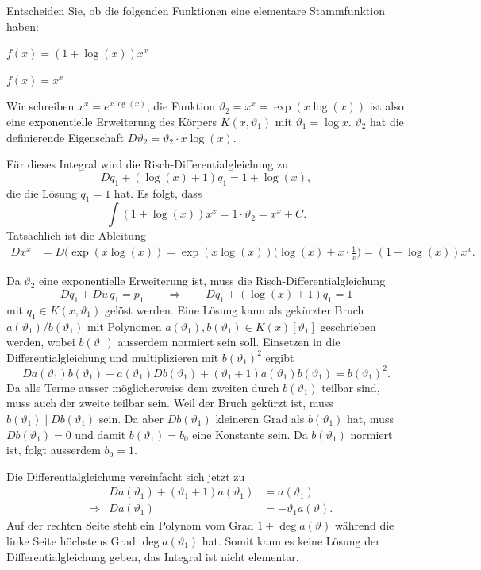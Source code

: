 Entscheiden Sie, ob die folgenden Funktionen eine elementare Stammfunktion
haben:
\begin{teilaufgaben}
\item $f(x)= (1+\log(x))x^x$
\item $f(x)=x^x$
\end{teilaufgaben}

\begin{loesung}
Wir schreiben $x^x = e^{x \log(x)}$, die Funktion
$\vartheta_2 = x^x = \exp(x\log(x))$ ist also eine exponentielle Erweiterung
des Körpers $K(x,\vartheta_1)$ mit $\vartheta_1=\log x$.
$\vartheta_2$ hat die definierende Eigenschaft
$D\vartheta_2 = \vartheta_2 \cdot x\log(x)$.
\begin{teilaufgaben}
\item 
Für dieses Integral wird die Risch-Differentialgleichung zu
\[
Dq_1 + (\log(x)+1)q_1 = 1 + \log(x),
\]
die die Lösung $q_1=1$ hat.
Es folgt, dass
\[
\int (1+\log(x))x^x = 1\cdot \vartheta_2 = x^x+C.
\]
Tatsächlich ist die Ableitung
\begin{align*}
Dx^x
&=
D(\exp(x\log(x))
=
\exp(x\log(x)) \biggl(\log(x) + x\cdot\frac{1}{x}\biggr)
=
(1+\log(x))x^x.
\end{align*}
\item
Da $\vartheta_2$ eine exponentielle Erweiterung ist, muss die
Risch-Differentialgleichung
\[
Dq_1
+
Du\, q_1 = p_1
\qquad\Rightarrow\qquad
Dq_1 + (\log(x) + 1)q_1 = 1
\]
mit $q_1\in K(x,\vartheta_1)$ gelöst werden.
Eine Lösung kann als gekürzter Bruch $a(\vartheta_1)/b(\vartheta_1)$ mit
Polynomen $a(\vartheta_1),b(\vartheta_1)\in K(x)[\vartheta_1]$ geschrieben
werden, wobei $b(\vartheta_1)$ ausserdem normiert sein soll.
Einsetzen in die Differentialgleichung und multiplizieren mit $b(\vartheta_1)^2$
ergibt
\[
Da(\vartheta_1) b(\vartheta_1)
-
a(\vartheta_1)Db(\vartheta_1)
+
(\vartheta_1+1)a(\vartheta_1)b(\vartheta_1)
=
b(\vartheta_1)^2.
\]
Da alle Terme ausser möglicherweise dem zweiten durch $b(\vartheta_1)$
teilbar sind, muss auch der zweite teilbar sein.
Weil der Bruch gekürzt ist, muss $b(\vartheta_1)\mid Db(\vartheta_1)$
sein.
Da aber $Db(\vartheta_1)$ kleineren Grad als $b(\vartheta_1)$ hat,
muss $Db(\vartheta_1)=0$ und damit $b(\vartheta_1)=b_0$ eine Konstante sein.
Da $b(\vartheta_1)$ normiert ist, folgt ausserdem $b_0=1$.

Die Differentialgleichung vereinfacht sich jetzt zu
\[
\begin{aligned}
&&
Da(\vartheta_1) + (\vartheta_1+1) a(\vartheta_1)
&= a(\vartheta_1)
\\
&\Rightarrow&
Da(\vartheta_1)
&= -\vartheta_1 a(\vartheta).
\end{aligned}
\]
Auf der rechten Seite steht ein Polynom vom Grad $1+\deg a(\vartheta)$
während die linke Seite höchstens Grad $\deg a(\vartheta_1)$ hat.
Somit kann es keine Lösung der Differentialgleichung geben, das Integral
ist nicht elementar.
\qedhere
\end{teilaufgaben}
\end{loesung}
